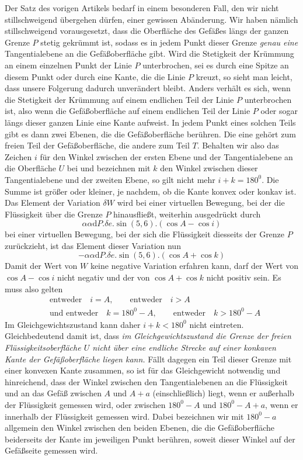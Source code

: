 Der Satz des vorigen Artikels bedarf in einem besonderen Fall, den wir nicht stillschweigend übergehen dürfen, einer gewissen Abänderung. Wir haben nämlich stillschweigend vorausgesetzt, dass die Oberfläche des Gefäßes längs der ganzen Grenze $P$ stetig gekrümmt ist, sodass es in jedem Punkt dieser Grenze \textit{genau eine} Tangentialebene an die Gefäßoberfläche gibt. Wird die Stetigkeit der Krümmung an einem einzelnen Punkt der Linie $P$ unterbrochen, sei es durch eine Spitze an diesem Punkt oder durch eine Kante, die die Linie $P$ kreuzt, so sieht man leicht, dass unsere Folgerung dadurch unverändert bleibt. Anders verhält es sich, wenn die Stetigkeit der Krümmung auf einem endlichen Teil der Linie $P$ unterbrochen ist, also wenn die Gefäßoberfläche auf einem endlichen Teil der Linie $P$ oder sogar längs dieser ganzen Linie eine Kante aufweist. In jedem Punkt eines solchen Teils gibt es dann zwei Ebenen,
die die Gefäßoberfläche berühren. Die eine gehört zum freien Teil der Gefäßoberfläche, die andere zum Teil $T$. Behalten wir also das Zeichen $i$ für den Winkel zwischen der ersten Ebene und der Tangentialebene an die Oberfläche $U$ bei und bezeichnen mit $k$ den Winkel zwischen dieser Tangentialebene und der zweiten Ebene, so gilt nicht mehr $i+k=180^0$. Die Summe ist größer oder kleiner, je nachdem, ob die Kante konvex oder konkav ist. Das Element der Variation $\delta W$ wird bei einer virtuellen Bewegung, bei der die Flüssigkeit über die Grenze $P$ hinausfließt, weiterhin ausgedrückt durch
\[
\alpha\alpha\mathrm{d}P.\delta e.\sin(5,6).(\cos A-\cos i)
\]
bei einer virtuellen Bewegung, bei der sich die Flüssigkeit diesseits der Grenze $P$ zurückzieht, ist das Element dieser Variation nun
\[
-\alpha\alpha\mathrm{d}P.\delta e.\sin(5,6).(\cos A+\cos k)
\]
Damit der Wert von $W$ keine negative Variation erfahren kann, darf der Wert von $\cos A-\cos i$ nicht negativ und der von $\cos A+\cos k$ nicht positiv sein. Es muss also gelten
\[
\begin{aligned}
&\text{entweder}\quad i=A,\qquad\text{entweder}\quad i>A\\
&\text{und entweder}\quad k=180^0-A,\qquad\text{entweder}\quad k>180^0-A
\end{aligned}
\]
Im Gleichgewichtszustand kann daher $i+k<180^0$ nicht eintreten. Gleichbedeutend damit ist, dass \textit{im Gleichgewichtszustand die Grenze der freien Flüssigkeitsoberfläche $U$ nicht über eine endliche Strecke auf einer konkaven Kante der Gefäßoberfläche liegen kann.} Fällt dagegen ein Teil dieser Grenze mit einer konvexen Kante zusammen, so ist für das Gleichgewicht notwendig und hinreichend, dass der Winkel zwischen den Tangentialebenen an die Flüssigkeit und an das Gefäß zwischen $A$ und $A+a$ (einschließlich) liegt, wenn er außerhalb der Flüssigkeit gemessen wird, oder zwischen $180^0-A$ und $180^0-A+a$, wenn er innerhalb der Flüssigkeit gemessen wird. Dabei bezeichnen wir mit $180^0-a$ allgemein den Winkel zwischen den beiden Ebenen, die die Gefäßoberfläche beiderseits der Kante im jeweiligen Punkt berühren, soweit dieser Winkel auf der Gefäßseite gemessen wird.

